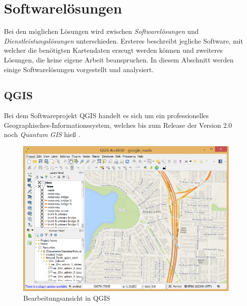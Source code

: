 \section{Softwarelösungen}
Bei den möglichen Lösungen wird zwischen \emph{Softwarelösungen} und \emph{Dienstleistungslösungen} unterschieden.
Ersteres beschreibt jegliche Software, mit welcher die benötigten Kartendaten erzeugt werden können und zweiteres Lösungen, die keine eigene Arbeit beanspruchen.
In diesem Abschnitt werden einige Softwarelösungen vorgestellt und analysiert.

\subsection{QGIS}
Bei dem Softwareprojekt QGIS handelt es sich um ein professionelles Geographisches-Informationssystem, welches bis zum Release der Version 2.0 noch \emph{Quantum GIS} hieß \parencite{QGI2013, SUT2013}.
\begin{figure}[h!]
	\centering
	\vspace{15pt}
	\includegraphics[scale=0.5]{images/analysis/qgis.png}
	\caption{Bearbeitungsansicht in QGIS \parencite{QGI}}
	\label{fig:analysis-qgis}
\end{figure}
